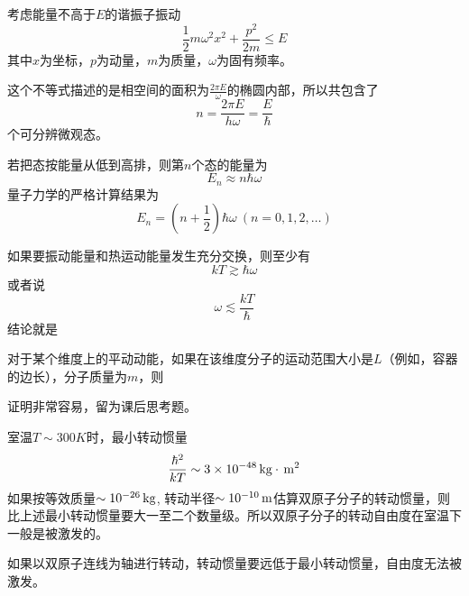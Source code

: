 \documentclass[CJK]{beamer}
\begin{document}
\begin{frame}
\bch
{\large
{}
考虑能量不高于$E$的谐振子振动
$$  \frac{1}{2} m\omega^2 x^2 + \frac{p^2}{2m} \le E$$
其中$x$为坐标，$p$为动量，$m$为质量，$\omega $为固有频率。

这个不等式描述的是相空间的面积为$\frac{2\pi E}{\omega}$的椭圆内部，所以共包含了
$$n = \frac{2\pi E}{ h \omega} = \frac{E}{\hbar}$$
个可分辨微观态。}

\ech
\end{frame}


\begin{frame}
\bch
{\large
若把态按能量从低到高排，则第$n$个态的能量为
$$ E_n \approx  n\hbar\omega$$
量子力学的严格计算结果为
$$ E_n =  (n+\frac{1}{2})\hbar \omega \ (n = 0,1,2,\ldots)$$
}
\ech
\end{frame}

\begin{frame}
\bch
    {\large
      如果要振动能量和热运动能量发生充分交换，则至少有
$$kT \gtrsim \hbar \omega$$
或者说
$$\omega \lesssim \frac{kT}{\hbar}$$
结论就是
}
\ech
\end{frame}


\begin{frame}
\bch
{\large
对于某个维度上的平动动能，如果在该维度分子的运动范围大小是$L$（例如，容器的边长），分子质量为$m$，则

证明非常容易，留为课后思考题。}
\ech
\end{frame}



\begin{frame}
\bch
{室温$T\sim 300K$时，最小转动惯量
$$ \frac{\hbar^2}{kT} \sim 3 \times 10^{-48} \,\mathrm{kg}\cdot \,\mathrm{m}^2  $$
如果按等效质量$\sim 10^{-26}\,\mathrm{kg}$, 转动半径$\sim 10^{-10}\,\mathrm{m}$估算双原子分子的转动惯量，则比上述最小转动惯量要大一至二个数量级。所以{\blue 双原子分子的转动自由度在室温下一般是被激发的}。

\skipline

如果以双原子连线为轴进行转动，转动惯量要远低于最小转动惯量，自由度无法被激发。
}
\ech
\end{frame}
\end{document}
